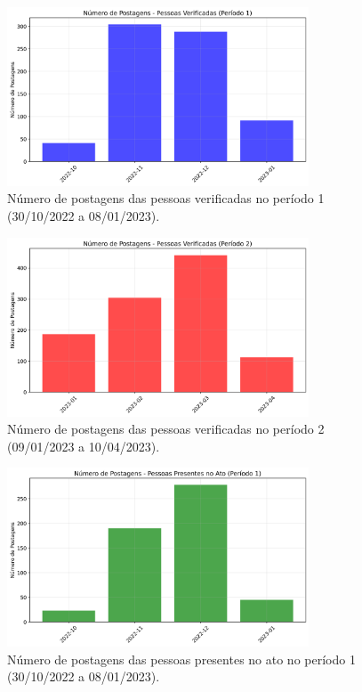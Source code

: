 \documentclass[manuscript,screen,review]{acmart}
\begin{document}
\begin{figure}[h]
\centering
\includegraphics[width=0.8\textwidth]{figura25_postagens_verificadas_periodo1.png}
\caption{Número de postagens das pessoas verificadas no período 1 (30/10/2022 a 08/01/2023).}
\label{fig:figura25}
\end{figure}

\begin{figure}[h]
\centering
\includegraphics[width=0.8\textwidth]{figura26_postagens_verificadas_periodo2.png}
\caption{Número de postagens das pessoas verificadas no período 2 (09/01/2023 a 10/04/2023).}
\label{fig:figura26}
\end{figure}

\begin{figure}[h]
\centering
\includegraphics[width=0.8\textwidth]{figura27_postagens_presentes_periodo1.png}
\caption{Número de postagens das pessoas presentes no ato no período 1 (30/10/2022 a 08/01/2023).}
\label{fig:figura27}
\end{figure}
\end{document}

